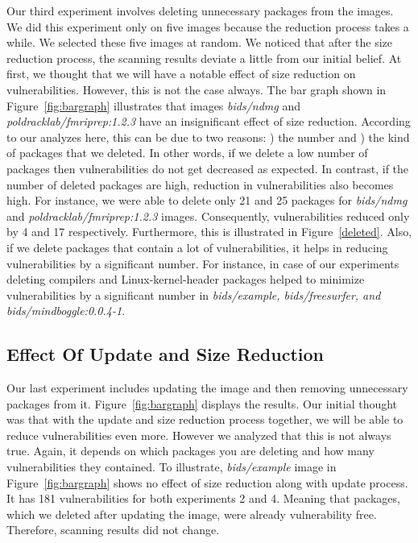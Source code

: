 \documentclass[a4paper,num-refs]{oup-contemporary}
\newcommand{\rom}[1]{\lowercase\expandafter{\romannumeral #1\relax}}
\begin{document}
Our third experiment involves deleting unnecessary packages from the images.
We did this experiment only on five images because the reduction process takes a
while. We selected these five images at random. We noticed that
after the size reduction process, the scanning results deviate a little from our initial belief.
At first, we thought that we will have a notable effect of size reduction on
vulnerabilities. However, this is not the case always. The bar graph shown in
Figure~\ref{fig:bargraph} illustrates that images \textit{bids/ndmg} and
\textit{poldracklab/fmriprep:1.2.3} have an insignificant effect of size reduction.
According to our analyzes here, this can be due to two reasons: \rom{1}) the number
and \rom{2}) the kind of packages that we deleted. In other
words, if we delete a low number of packages then vulnerabilities do not get decreased as expected.
In contrast, if the number of deleted packages are high, reduction
in vulnerabilities also becomes high. For instance, we were able to delete only 21 and 25 packages for 
\textit{bids/ndmg} and \textit{poldracklab/fmriprep:1.2.3} images. Consequently, vulnerabilities
reduced only by 4 and 17 respectively. Furthermore, this is illustrated in Figure~\ref{deleted}.
Also, if we delete packages that contain a lot of vulnerabilities, it helps in reducing
vulnerabilities by a significant number. For instance, in case of our experiments
deleting compilers and Linux-kernel-header packages helped to minimize vulnerabilities
by a significant number in \textit{bids/example, bids/freesurfer, and bids/mindboggle:0.0.4-1}. 

\subsection{Effect Of Update and Size Reduction}

Our last experiment includes updating the image and then removing unnecessary packages from it.
Figure~\ref{fig:bargraph} displays the results. 
Our initial thought was that with the update and size reduction process together, we will be able to
reduce vulnerabilities even more. However
we analyzed that this is not always true. Again, it depends on which packages you are deleting and how
many vulnerabilities they contained. To illustrate, \textit{bids/example} image in Figure~\ref{fig:bargraph}
shows no effect of size reduction along with update process. It has 181 vulnerabilities for both experiments 2 and 4.
Meaning that packages, which we deleted after updating the image, were already vulnerability free. Therefore,
scanning results did not change.
\end{document}
